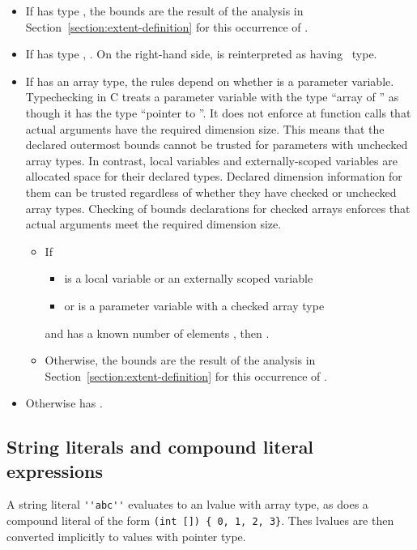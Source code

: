 \begin{itemize}
\item
  If  has type \arrayptr, the bounds are the result of
  the analysis in Section~\ref{section:extent-definition}
  for this occurrence of .
\item
  If  has type \ptrT, 
  .
   On the right-hand side,  is reinterpreted as having \arrayptr\ type.
\item
  If  has an array type, the rules depend on whether   is a parameter
  variable.  Typechecking in C treats a parameter variable with the type ``array of ''
   as though it has the type ``pointer to ''.   It does not enforce 
  at function calls that actual arguments have the required dimension size.  This means
  that the declared outermost bounds cannot be trusted for parameters with unchecked
  array types.  In contrast, local variables and externally-scoped variables are allocated 
  space for their declared types.  Declared dimension information for them can be trusted 
  regardless of whether they have checked or unchecked array types.  Checking of bounds 
  declarations for checked arrays  enforces that actual arguments meet the required
  dimension size.
\begin{itemize}
\item If 
\begin{itemize} 
\item {} is a local variable or an externally scoped variable 
\item or  is a parameter variable with a checked array type
\end{itemize}
and  has a known number of elements , then  
  .
\item Otherwise, the bounds are the result of the analysis in 
  Section~\ref{section:extent-definition} for this occurrence of .
\end{itemize}
\item  Otherwise  has \boundsunknown.
\end{itemize}

\subsection{String literals and compound literal expressions}
A string literal \lstinline+''abc''+ evaluates to an lvalue with array type,
as does a compound literal of the form \lstinline+(int []) { 0, 1, 2, 3}+.
Thes lvalues are then converted implicitly to values with pointer type.

